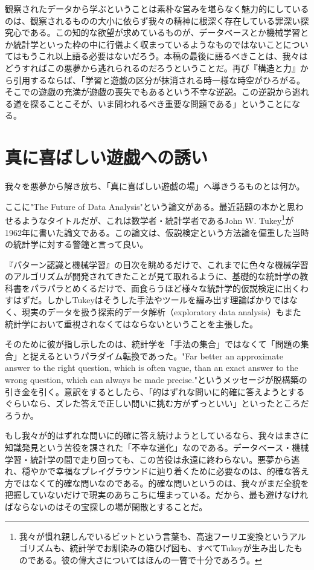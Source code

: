 観察されたデータから学ぶということは素朴な営みを堪らなく魅力的にしているのは、観察されるものの大小に依らず我々の精神に根深く存在している罪深い探究心である。この知的な欲望が求めているものが、データベースとか機械学習とか統計学といった枠の中に行儀よく収まっているようなものではないことについてはもうこれ以上語る必要はないだろう。本稿の最後に語るべきことは、我々はどうすればこの悪夢から逃れられるのだろうということだ。再び『構造と力』から引用するならば、「学習と遊戯の区分が抹消される時一様な時空がひろがる。そこでの遊戯の充満が遊戯の喪失でもあるという不幸な逆説。この逆説から逃れる道を探ることこそが、いま問われるべき重要な問題である」ということになる。

\section{真に喜ばしい遊戯への誘い}
我々を悪夢から解き放ち、「真に喜ばしい遊戯の場」へ導きうるものとは何か。

ここに"The Future of Data Analysis"という論文がある。最近話題の本かと思わせるようなタイトルだが、これは数学者・統計学者であるJohn W. Tukey\footnote{我々が慣れ親しんでいるビットという言葉も、高速フーリエ変換というアルゴリズムも、統計学でお馴染みの箱ひげ図も、すべてTukeyが生み出したものである。彼の偉大さについてはほんの一瞥で十分であろう。}が1962年に書いた論文である。この論文は、仮説検定という方法論を偏重した当時の統計学に対する警鐘と言って良い。

『パターン認識と機械学習』の目次を眺めるだけで、これまでに色々な機械学習のアルゴリズムが開発されてきたことが見て取れるように、基礎的な統計学の教科書をパラパラとめくるだけで、面食らうほど様々な統計学的仮説検定に出くわすはずだ。しかしTukeyはそうした手法やツールを編み出す理論ばかりではなく、現実のデータを扱う探索的データ解析（exploratory data analysis）もまた統計学において重視されなくてはならないということを主張した。

そのために彼が指し示したのは、統計学を「手法の集合」ではなくて「問題の集合」と捉えるというパラダイム転換であった。"Far better an approximate answer to the right question, which is often vague, than an exact answer to the wrong question, which can always be made precise."というメッセージが脱構築の引き金を引く。意訳をするとしたら、「的はずれな問いに的確に答えようとするぐらいなら、ズレた答えで正しい問いに挑む方がずっといい」といったところだろうか。

もし我々が的はずれな問いに的確に答え続けようとしているなら、我々はまさに知識発見という苦役を課された「不幸な道化」なのである。データベース・機械学習・統計学の間で走り回っても、この苦役は永遠に終わらない。悪夢から逃れ、穏やかで幸福なプレイグラウンドに辿り着くために必要なのは、的確な答え方ではなくて的確な問いなのである。的確な問いというのは、我々がまだ全貌を把握していないだけで現実のあちこちに埋まっている。だから、最も避けなければならないのはその宝探しの場が閑散とすることだ。


